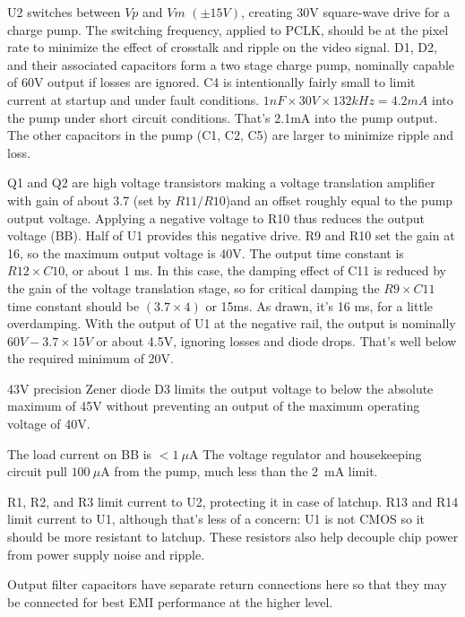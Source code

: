 \documentclass[a4paper,12pt]{article}
\begin{document}

U2 switches between $Vp$ and $Vm$ $(\pm15V)$, creating 30V square-wave drive for a charge pump. The switching frequency, applied to PCLK, should be at the pixel rate to minimize the effect of crosstalk and ripple on the video signal. D1, D2, and their associated capacitors form a two stage charge pump, nominally capable of 60V output if losses are ignored. C4 is intentionally fairly small to limit current at startup and under fault conditions. $1nF\times30V\times132kHz=4.2mA$ into the pump under short circuit conditions. That's 2.1mA into the pump output.
The other capacitors in the pump (C1, C2, C5) are larger to minimize ripple and loss.

Q1 and Q2 are high voltage transistors making a voltage translation amplifier with gain of about 3.7 (set by $R11/R10$)and an offset roughly equal to the pump output voltage. Applying a negative voltage to R10 thus reduces the output voltage (BB). Half of U1 provides this negative drive. R9 and R10 set the gain at 16, so the maximum output voltage is 40V. The output time constant is $R12\times C10$, or about 1 ms. In this case, the damping effect of C11 is reduced by the gain of the voltage translation stage, so for critical damping the $R9\times C11$ time constant should be $(3.7\times4)$ or 15ms. As drawn, it's 16 ms, for a little overdamping. With the output of U1 at the negative rail, the output is nominally $60V-3.7\times15V$ or about 4.5V, ignoring losses and diode drops. That's well below the required minimum of 20V.

43V precision Zener diode D3 limits the output voltage to below the absolute maximum of 45V without preventing an output of the maximum operating voltage of 40V.

The load current on BB is $<1\ \mu$A The voltage regulator and housekeeping circuit pull $100\ \mu$A from the pump, much less than the 2\ mA limit.

R1, R2, and R3 limit current to U2, protecting it in case of latchup. R13 and R14 limit current to U1, although that's less of a concern: U1 is not CMOS so it should be more resistant to latchup. These resistors also help decouple chip power from power supply noise and ripple.

Output filter capacitors have separate return connections here so that they may be connected for best EMI performance at the higher level.
\end{document}
